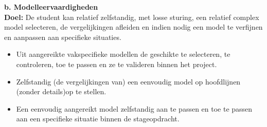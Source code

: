 \documentclass[11pt]{article}
\newcommand{\myCheckBox}[1]{%
  \checkBox[\symbolchoice{cross}]{#1}{10bp}{10bp}{On}%
}
\begin{document}


\textbf{b. Modelleervaardigheden} \\
\textbf{Doel:} De student kan relatief zelfstandig, met losse sturing, een relatief complex model selecteren, de vergelijkingen afleiden en indien nodig een model te verfijnen en aanpassen aan specifieke situaties.

\begin{itemize}
  \item Uit aangereikte vakspecifieke modellen de geschikte te selecteren, te controleren, toe te passen en ze te valideren binnen het project.
  \item Zelfstandig (de vergelijkingen van) een eenvoudig model op hoofdlijnen (zonder details)op te stellen.
  \item Een eenvoudig aangereikt model zelfstandig aan te passen en toe te passen aan een specifieke situatie binnen de stageopdracht.
\end{itemize}
\end{document}
